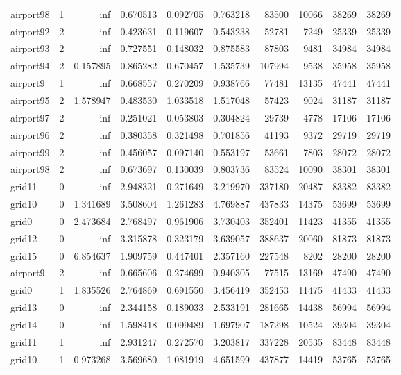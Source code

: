 \begin{longtable}{|l|r|r|r|r|r|r|r|r|r|}
airport98 & 1 & inf & 0.670513 & 0.092705 & 0.763218 & 83500 & 10066 & 38269 & 38269 \\
airport92 & 2 & inf & 0.423631 & 0.119607 & 0.543238 & 52781 & 7249 & 25339 & 25339 \\
airport93 & 2 & inf & 0.727551 & 0.148032 & 0.875583 & 87803 & 9481 & 34984 & 34984 \\
airport94 & 2 & 0.157895 & 0.865282 & 0.670457 & 1.535739 & 107994 & 9538 & 35958 & 35958 \\
airport9 & 1 & inf & 0.668557 & 0.270209 & 0.938766 & 77481 & 13135 & 47441 & 47441 \\
airport95 & 2 & 1.578947 & 0.483530 & 1.033518 & 1.517048 & 57423 & 9024 & 31187 & 31187 \\
airport97 & 2 & inf & 0.251021 & 0.053803 & 0.304824 & 29739 & 4778 & 17106 & 17106 \\
airport96 & 2 & inf & 0.380358 & 0.321498 & 0.701856 & 41193 & 9372 & 29719 & 29719 \\
airport99 & 2 & inf & 0.456057 & 0.097140 & 0.553197 & 53661 & 7803 & 28072 & 28072 \\
airport98 & 2 & inf & 0.673697 & 0.130039 & 0.803736 & 83524 & 10090 & 38301 & 38301 \\
grid11 & 0 & inf & 2.948321 & 0.271649 & 3.219970 & 337180 & 20487 & 83382 & 83382 \\
grid10 & 0 & 1.341689 & 3.508604 & 1.261283 & 4.769887 & 437833 & 14375 & 53699 & 53699 \\
grid0 & 0 & 2.473684 & 2.768497 & 0.961906 & 3.730403 & 352401 & 11423 & 41355 & 41355 \\
grid12 & 0 & inf & 3.315878 & 0.323179 & 3.639057 & 388637 & 20060 & 81873 & 81873 \\
grid15 & 0 & 6.854637 & 1.909759 & 0.447401 & 2.357160 & 227548 & 8202 & 28200 & 28200 \\
airport9 & 2 & inf & 0.665606 & 0.274699 & 0.940305 & 77515 & 13169 & 47490 & 47490 \\
grid0 & 1 & 1.835526 & 2.764869 & 0.691550 & 3.456419 & 352453 & 11475 & 41433 & 41433 \\
grid13 & 0 & inf & 2.344158 & 0.189033 & 2.533191 & 281665 & 14438 & 56994 & 56994 \\
grid14 & 0 & inf & 1.598418 & 0.099489 & 1.697907 & 187298 & 10524 & 39304 & 39304 \\
grid11 & 1 & inf & 2.931247 & 0.272570 & 3.203817 & 337228 & 20535 & 83448 & 83448 \\
grid10 & 1 & 0.973268 & 3.569680 & 1.081919 & 4.651599 & 437877 & 14419 & 53765 & 53765 \\

\end{longtable}
